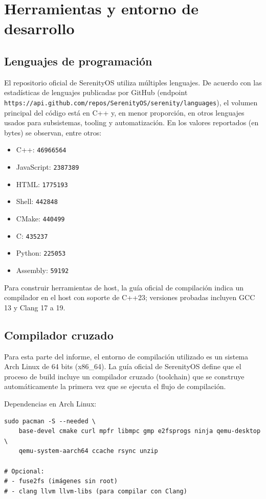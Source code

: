 
\section{Herramientas y entorno de desarrollo}
\subsection{Lenguajes de programación}
El repositorio oficial de SerenityOS utiliza múltiples lenguajes. De acuerdo con las estadísticas de lenguajes publicadas por GitHub (endpoint \texttt{https://api.github.com/repos/SerenityOS/serenity/languages}), el volumen principal del código está en C++ y, en menor proporción, en otros lenguajes usados para subsistemas, tooling y automatización. En los valores reportados (en bytes) se observan, entre otros:

\begin{itemize}
		\item C++: \texttt{46966564}
		\item JavaScript: \texttt{2387389}
		\item HTML: \texttt{1775193}
		\item Shell: \texttt{442848}
		\item CMake: \texttt{440499}
		\item C: \texttt{435237}
		\item Python: \texttt{225053}
		\item Assembly: \texttt{59192}
\end{itemize}

Para construir herramientas de host, la guía oficial de compilación indica un compilador en el host con soporte de C++23; versiones probadas incluyen GCC 13 y Clang 17 a 19.

\subsection{Compilador cruzado}
Para esta parte del informe, el entorno de compilación utilizado es un sistema Arch Linux de 64 bits (x86\_64). La guía oficial de SerenityOS define que el proceso de build incluye un compilador cruzado (toolchain) que se construye automáticamente la primera vez que se ejecuta el flujo de compilación.

Dependencias en Arch Linux:

\begin{verbatim}
sudo pacman -S --needed \
	base-devel cmake curl mpfr libmpc gmp e2fsprogs ninja qemu-desktop \
	qemu-system-aarch64 ccache rsync unzip

# Opcional:
# - fuse2fs (imágenes sin root)
# - clang llvm llvm-libs (para compilar con Clang)
\end{verbatim}

